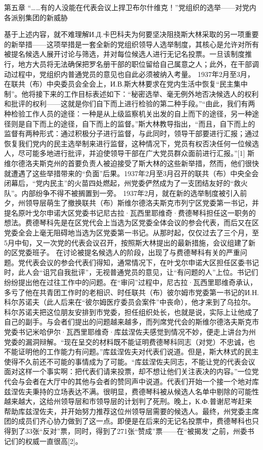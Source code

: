 
第五章
“……有的人没能在代表会议上捍卫布尔什维克！”党组织的选举——对党内各派别集团的新威胁

基于上述内容，就不难理解И.Д.卡巴科夫为何要坚决阻挠斯大林采取的另一项重要的新举措——这项举措是一套全新的党组织领导人选举制度，其核心是允许对所有被提名候选人展开讨论与筛选，并对每位候选人进行无记名投票。一旦该制度推行，地方大员将无法确保把罗名册干部的职位留给自己属意之人；此外，在干部调动过程中，党组织内普通党员的意见也自此必须被纳入考量。
1937年2月至3月，在联共（布）中央委员会全会上，И.В.斯大林要求在党内生活中恢复“民主集中制”。他将接下来的工作目标表述如下：“秘密选举、毫无例外地否决候选人的权利和批评的权利——这就是你们自下而上进行检验的第二种手段。”“由此，我们有两种检验工作人员的途径：一种是从上级监察机关出发的自上而下的途径，另一种途径则是自下而上的途径，自下而上的监督。”斯大林教导指出，“而且，自下而上的监督有两种形式：通过积极分子进行监督，与此同时，领导干部要进行汇报；通过恢复我们党内的民主选举制来进行监督，这种情况下，党员有权否决任何一位候选人，尽可能多地进行批评，并迫使领导干部在广大党员群众面前进行汇报。”[1]
斯维尔德洛夫斯克州的首要负责人被迫接受了斯大林的这些新举措，然而，他们很快就遭遇了这些举措带来的“负面”后果。1937年2月至3月召开的联共（布）中央全会闭幕后，“党内民主”的火苗四处燃起，州党委俨然成为了一支团结友好的“救火队”。内部纷争不得不被搁置到一旁。
1937年2月，就在新的选举制度被引入前夕，州领导层萌生了撤换联共（布）斯维尔德洛夫斯克市列宁区党委第一书记，并提名原叶戈尔申诺大区党委书记尼古拉·瓦西里耶维奇·费德琴科担任这一职务的想法。费德琴科先是在区党代会上当选为区党委全体会议的参会代表，而后又在区党委全会上毫无阻碍地当选为区党委第一书记。从那时起，仅仅过去了三个月，至5月中旬，又一次党的代表会议召开，按照斯大林提出的最新措施，会议组建了新的区党委班子。
在讨论被提名候选人的阶段，出现了与费德琴科有关的严重问题。党代表会议的参会代表们得知，通常情况下，在叶戈尔申诺大区担任区委书记时，此人会“诅咒自我批评”，无视普通党员的意见，让“有问题的人”上位。书记们纷纷提出他在过往工作中的问题。在“审问”过程中，尼古拉·瓦西里耶维奇承认，多亏了他在共青团工作时的老相识、时任联共（布）彼尔姆市党委第一书记的И.Н.科尔苏诺夫（此人后来在“彼尔姆医疗委员会案件”中丧命），他才来到了乌拉尔。科尔苏诺夫把这位朋友安排到市党委，担任组织处长，也就是说，实际上让他成了自己的副手。与会者们提出的问题越来越多，而列席党代会的斯维尔德洛夫斯克市党委书记米哈伊尔·瓦西里耶维奇·库兹涅佐夫感觉到情况不妙，便走上讲台为州党委的漏洞辩解。“现在呈交的材料既不能证明费德琴科同志（对党）不忠诚，也不能证明他的工作能力有问题。”库兹涅佐夫对代表们说道。但是，斯大林式的民主使得不久前还不可能的事情成为了可能。“库兹涅佐夫同志，不能让党的代表会议面对这样一个事实啊：把代表们请来投票，却不想让他们关注表决的内容。”一位党代会与会者在大厅中的其他与会者的赞同声中说道。代表们开始一个接一个地对库兹涅佐夫秉持的立场表达不满。很明显，费德琴科被从候选人名单中剔除的可能性越来越大，这给州领导层和市领导层的计划判了死刑。晚上，К.Ф.普谢尼岑赶来帮助库兹涅佐夫，并开始努力推荐这位州领导层需要的候选人。最终，州党委主席团的成员们齐心协力做到了这一点。即便是在后来的无记名投票中，费德琴科也只得到了33张“反对”票，同时，得到了271张“赞成”票——在“被揭发”之前，州委书记们的权威一直很高[2]。
